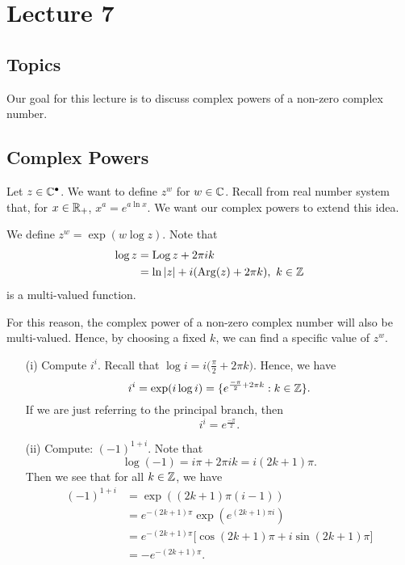 \documentclass[a4paper]{report}
\begin{document}
\section{Lecture 7}

\subsection{Topics}

Our goal for this lecture is to discuss complex powers of a non-zero complex number.

\subsection{Complex Powers}

Let \( z \in \mathbb{C}^{\bullet} \). We want to define \( z^{w} \) for \( w \in \mathbb{C}  \). Recall from real number system that, for \( x \in {\ensuremath{\mathbb{R}}}_{+} \), \( x^{a} = e^{a \ln x } \). We want our complex powers to extend this idea.

\begin{definition}[ ]
   We define \( z^{w} = \exp(w \log z) \). Note that  
   \begin{align*}
       \log z &= \operatorname{Log} z + 2 \pi i k  \\
              &= \ln | z  |  + i (\operatorname{Arg}(z) + 2\pi k), \ k \in \mathbb{Z} 
   \end{align*}
   is a multi-valued function.
\end{definition}

For this reason, the complex power of a non-zero complex number will also be multi-valued.
Hence, by choosing a fixed \( k  \), we can find a specific value of \( z^{w} \).

\begin{eg}
    \begin{enumerate}
        \item[(i)] Compute \( i^{i} \). Recall that \( \log i = i \Big(  \frac{ \pi  }{  2  }  + 2 \pi k  \Big) \). Hence, we have 
            \[  i^{i} = \exp(i \log i) = \{ e^{\frac{ -\pi }{ 2 }  + 2 \pi k }: k \in \mathbb{Z}  \}. \]
            If we are just referring to the principal branch, then 
            \[ i^{i} = e^{\frac{ -\pi }{ 2 } }.  \]
        \item[(ii)] Compute: \( (-1)^{1 + i} \).
            Note that 
            \[  \log(-1) = i \pi + 2 \pi i k  =  i (2k+1) \pi. \]
            Then we see that for all \( k \in \mathbb{Z}  \), we have
            \begin{align*}
                (-1)^{1 + i} &= \exp((2k+1)\pi (i-1)) \\
                             &= e^{-(2k+1)\pi} \exp(e^{(2k+1) \pi i }) \\
                             &= e^{-(2k+1)\pi} \Big[\cos (2k+1) \pi + i \sin (2k+1) \pi \Big] \\
                             &= - e^{-(2k+1)\pi}.
            \end{align*}
    \end{enumerate}
\end{eg}
\end{document}
